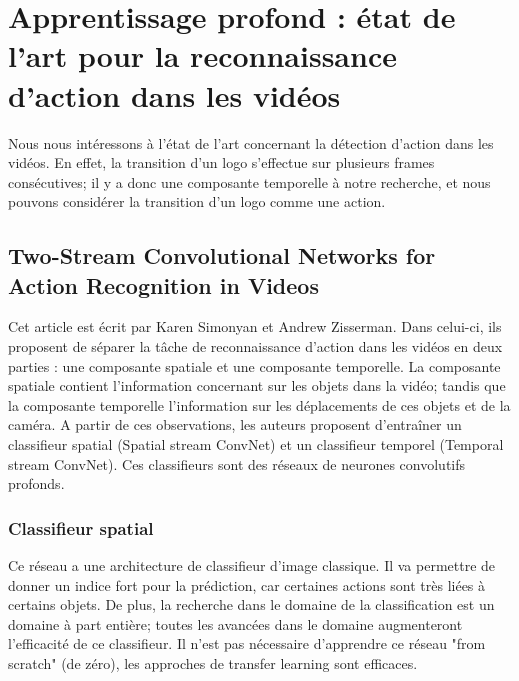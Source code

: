 \documentclass[11pt]{article}
\begin{document}
\section{Apprentissage profond : état de l'art pour la reconnaissance d'action dans les vidéos}
\label{sec:orgc62ba9f}
Nous nous intéressons à l'état de l'art concernant la détection d'action dans les vidéos. 
En effet, la transition d'un logo s'effectue sur plusieurs frames consécutives; il y a donc une composante temporelle à notre recherche, et nous pouvons considérer la transition d'un logo comme une action.

\subsection{Two-Stream Convolutional Networks for Action Recognition in Videos}
\label{sec:org7704dbb}
Cet article est écrit par Karen Simonyan et Andrew Zisserman. Dans celui-ci, ils proposent de séparer la tâche de reconnaissance d'action dans les vidéos en deux parties : une composante spatiale et une composante temporelle.
La composante spatiale contient l'information concernant sur les objets dans la vidéo; tandis que la composante temporelle l'information sur les déplacements de ces objets et de la caméra.
A partir de ces observations, les auteurs proposent d'entraîner un classifieur spatial (Spatial stream ConvNet) et un classifieur temporel (Temporal stream ConvNet).
Ces classifieurs sont des réseaux de neurones convolutifs profonds.

\subsubsection{Classifieur spatial}
\label{sec:org351c09e}
Ce réseau a une architecture de classifieur d'image classique. 
Il va permettre de donner un indice fort pour la prédiction, car certaines actions sont très liées à certains objets.
De plus, la recherche dans le domaine de la classification est un domaine à part entière;
toutes les avancées dans le domaine augmenteront l'efficacité de ce classifieur.
Il n'est pas nécessaire d'apprendre ce réseau "from scratch" (de zéro), les approches de transfer learning sont efficaces.
\end{document}

